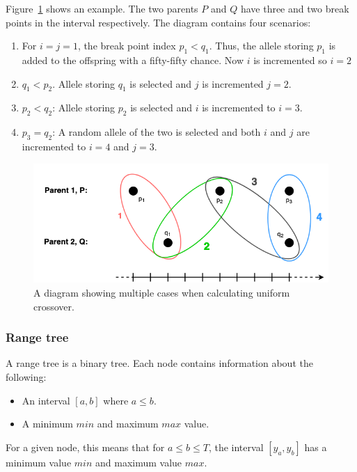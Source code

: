 \begin{description}
    Figure~\ref{fig:uniform-crossover} shows an example. The two parents $P$ and
    $Q$ have three and two break points in the interval respectively. The
    diagram contains four scenarios:
    
    \begin{enumerate}
        \item For $i = j = 1$, the break point index $p_1 < q_1$. Thus, the
        allele storing $p_1$ is added to the offspring with a fifty-fifty
        chance. Now $i$ is incremented so $i = 2$ 
        
        \item $q_1 < p_2$. Allele storing $q_1$ is selected and $j$ is
        incremented $j = 2$. 
        
        \item $p_2 < q_2$: Allele storing $p_2$ is selected and $i$ is
        incremented to $i = 3$. 
        
        \item $p_3 = q_2$: A random allele of the two is selected and both $i$
        and $j$ are incremented to $i = 4$ and $j = 3$. 
    \end{enumerate}
    
\end{description}

\begin{figure}[h]
    \centering
    \includegraphics[width=.8\textwidth]{fig/uniform-crossover.png}
    \caption{A diagram showing multiple cases when calculating uniform crossover.}
    \label{fig:uniform-crossover}
\end{figure}

\subsubsection{Range tree} \label{sec:range-tree-design}

A range tree is a binary tree. Each node contains information about the following:
\begin{itemize}
    \item An interval $[a,b]$ where $a \leq b$. 
    \item A minimum $min$ and maximum $max$ value. 
\end{itemize}
For a given node, this means that for $a \leq b \leq T$, the interval
$[y_a,y_b]$ has a minimum value $min$ and maximum value $max$. 

